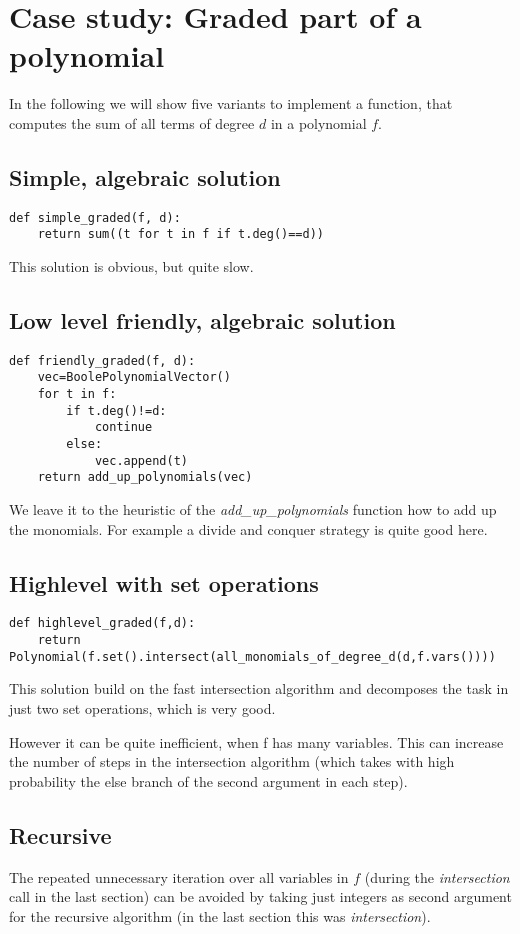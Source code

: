 \documentclass[]{article}
\newcommand{\functionname}[1]{\textit{#1}\xspace}
\newcounter{thm}
\begin{document}
\section{Case study: Graded part of a polynomial}
In the following we will show five variants to implement a function, that computes the sum of all terms of degree $d$ in a polynomial $f$.
\subsection{Simple, algebraic solution}
\begin{verbatim}
def simple_graded(f, d):
    return sum((t for t in f if t.deg()==d))   
\end{verbatim}
This solution is obvious, but quite slow.
\subsection{Low level friendly, algebraic solution}
\begin{verbatim}
def friendly_graded(f, d):
    vec=BoolePolynomialVector()
    for t in f:
        if t.deg()!=d:
            continue
        else:
            vec.append(t)
    return add_up_polynomials(vec)
\end{verbatim}
We leave it to the heuristic of the \functionname{add\_up\_polynomials} function how to add up the monomials. For example a divide and conquer strategy is quite good here.
\subsection{Highlevel with set operations}
\begin{verbatim}
def highlevel_graded(f,d):
    return Polynomial(f.set().intersect(all_monomials_of_degree_d(d,f.vars())))
\end{verbatim}
This solution build on the fast intersection algorithm and decomposes the task in just two set operations, which is very good.

However it can be quite inefficient, when f has many variables.
This can increase the number of steps in the intersection algorithm (which takes with high probability the else branch of the second argument in each step).
\subsection{Recursive}
The repeated unnecessary iteration over all variables in $f$ (during the \functionname{intersection} call in the last section) can be avoided by taking just integers as second argument for the recursive algorithm (in the last section this was \functionname{intersection}).
\end{document}
